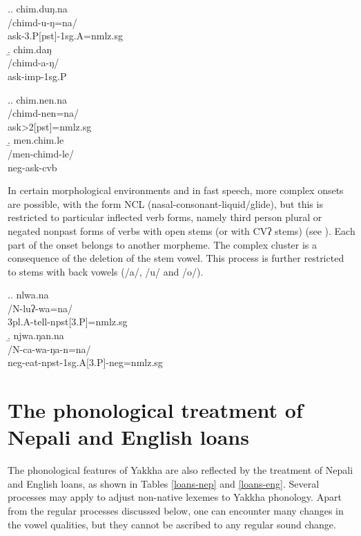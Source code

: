 \ex.\a. \glll chim.duŋ.na\\
/chimd-u-ŋ=na/\\
ask{\sc -3.P[pst]-1sg.A=nmlz.sg}\\
\b. \glll chim.daŋ\\
/chimd-a-ŋ/\\
ask{\sc -imp-1sg.P}\\

\ex.\a. \glll chim.nen.na\\
/chimd-nen=na/\\
ask{>2[pst]=nmlz.sg}\\
\b. \glll men.chim.le\\
/men-chimd-le/\\
{\sc neg-}ask{\sc -cvb}\\


In certain morphological environments and in fast speech, more complex onsets are possible, with the form NCL (nasal-consonant-liquid/glide), but this is restricted to particular inflected verb forms, namely third person plural or negated nonpast forms of verbs with open stems (or with CVʔ stems) (see \Next). Each part of the onset belongs to another morpheme. The complex cluster is a consequence of the deletion of the stem vowel. This process is further restricted to stems with back vowels (/a/, /u/ and /o/). 



\ex.\a. \glll nlwa.na\\
/N-luʔ-wa=na/\\
{\sc 3pl.A-}tell{\sc -npst[3.P]=nmlz.sg}\\
\b. \glll njwa.ŋan.na\\
/N-ca-wa-ŋa-n=na/\\
{\sc neg-}eat{\sc -npst-1sg.A[3.P]-neg=nmlz.sg}\\



\section{The phonological treatment of Nepali and English loans}\label{loansphon}

The phonological features of Yakkha are also reflected by the treatment of Nepali and English loans, as shown in Tables \ref{loans-nep} and \ref{loans-eng}. Several processes may apply to adjust non-native lexemes to Yakkha phonology. Apart from the regular processes discussed below, one can encounter many changes in the vowel qualities, but they cannot be ascribed to any regular sound change.

